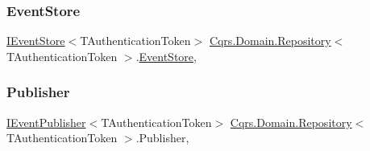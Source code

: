 \mbox{\label{classCqrs_1_1Domain_1_1Repository_a9adbd73546e04ef67c8fb032e9c6d1a8}} 
\subsubsection{\texorpdfstring{Event\+Store}{EventStore}}
{\footnotesize\ttfamily \hyperlink{interfaceCqrs_1_1Events_1_1IEventStore}{I\+Event\+Store}$<$T\+Authentication\+Token$>$ \hyperlink{classCqrs_1_1Domain_1_1Repository}{Cqrs.\+Domain.\+Repository}$<$ T\+Authentication\+Token $>$.\hyperlink{classCqrs_1_1Events_1_1EventStore}{Event\+Store}\hspace{0.3cm}{\ttfamily [get]}, {\ttfamily [protected]}}

\mbox{\label{classCqrs_1_1Domain_1_1Repository_a11b1d3a66404b212e93ca706e7c5eea4}} 
\subsubsection{\texorpdfstring{Publisher}{Publisher}}
{\footnotesize\ttfamily \hyperlink{interfaceCqrs_1_1Events_1_1IEventPublisher}{I\+Event\+Publisher}$<$T\+Authentication\+Token$>$ \hyperlink{classCqrs_1_1Domain_1_1Repository}{Cqrs.\+Domain.\+Repository}$<$ T\+Authentication\+Token $>$.Publisher\hspace{0.3cm}{\ttfamily [get]}, {\ttfamily [protected]}}

